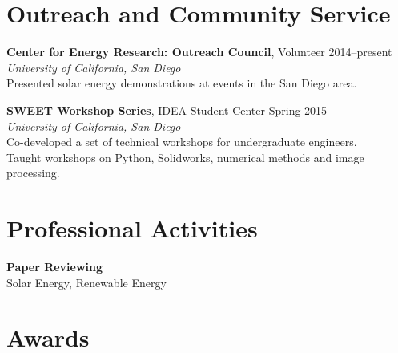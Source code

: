 \documentclass[]{res}
\begin{document}
\begin{resume}
\section{Outreach and Community Service}
\vspace{0.1in}
%

\textbf{Center for Energy Research: Outreach Council}, Volunteer \hfill 2014--present \\
\textit{University of California, San Diego} \\
Presented solar energy demonstrations at events in the San Diego area.

\textbf{SWEET Workshop Series}, IDEA Student Center \hfill Spring 2015 \\
\textit{University of California, San Diego} \\
Co-developed a set of technical workshops for undergraduate engineers. \\
Taught workshops on Python, Solidworks, numerical methods and image processing.


\section{Professional Activities}
\vspace{0.1in}

\textbf{Paper Reviewing} \\
Solar Energy, Renewable Energy


%
\section{Awards}
\vspace{0.1in}


\end{resume}
\end{document}
